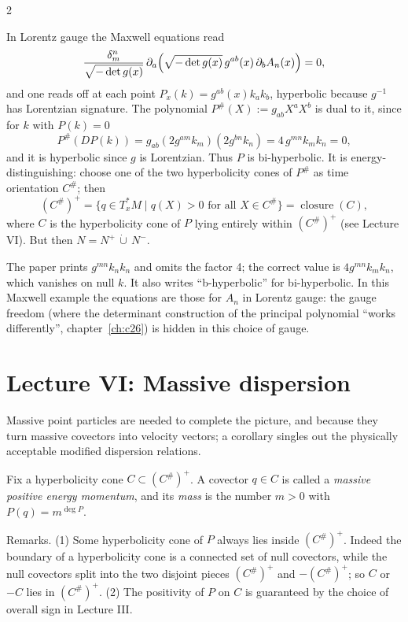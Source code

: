 \begin{paracol}{2}
\begin{example}\label{ex:c29-maxwell}
In Lorentz gauge the Maxwell equations read
\[
  \frac{\delta^n_m}{\sqrt{-\det g(x)}}\,\partial_a\Bigl(\sqrt{-\det g(x)}\,g^{ab}(x)\,\partial_bA_n(x)\Bigr)=0,
\]
and one reads off at each point $P_x(k)=g^{ab}(x)k_ak_b$, hyperbolic because $g^{-1}$ has Lorentzian signature. The polynomial $P^\#(X):=g_{ab}X^aX^b$ is dual to it, since for $k$ with $P(k)=0$
\[
  P^\#(DP(k))=g_{ab}(2g^{am}k_m)(2g^{bn}k_n)=4\,g^{mn}k_mk_n=0,
\]
and it is hyperbolic since $g$ is Lorentzian. Thus $P$ is bi-hyperbolic. It is energy-distinguishing: choose one of the two hyperbolicity cones of $P^\#$ as time orientation $C^\#$; then
\[
  (C^\#)^+=\{q\in T^*_xM\mid q(X)>0\text{ for all }X\in C^\#\}=\operatorname{closure}(C),
\]
where $C$ is the hyperbolicity cone of $P$ lying entirely within $(C^\#)^+$ (see Lecture VI). But then $N=N^+\,\dot\cup\,N^-$.
\end{example}
\begin{coursenote}
The paper prints $g^{mn}k_nk_n$ and omits the factor 4; the correct value is $4g^{mn}k_mk_n$, which vanishes on null $k$. It also writes ``b-hyperbolic'' for bi-hyperbolic. In this Maxwell example the equations are those for $A_n$ in Lorentz gauge: the gauge freedom (where the determinant construction of the principal polynomial ``works differently'', chapter~\ref{ch:c26}) is hidden in this choice of gauge.
\end{coursenote}

\section{Lecture VI: Massive dispersion}\label{sec:c29-L6}

 Massive point particles are needed to complete the picture, and because they turn massive covectors into velocity vectors; a corollary singles out the physically acceptable modified dispersion relations.

\begin{definition}\label{def:c29-massive}
Fix a hyperbolicity cone $C\subset(C^\#)^+$. A covector $q\in C$ is called a \emph{massive positive energy momentum}, and its \emph{mass} is the number $m>0$ with $P(q)=m^{\deg P}$.
\end{definition}

Remarks. (1) Some hyperbolicity cone of $P$ always lies inside $(C^\#)^+$. Indeed the boundary of a hyperbolicity cone is a connected set of null covectors, while the null covectors split into the two disjoint pieces $(C^\#)^+$ and $-(C^\#)^+$; so $C$ or $-C$ lies in $(C^\#)^+$. (2) The positivity of $P$ on $C$ is guaranteed by the choice of overall sign in Lecture III.


\end{paracol}
